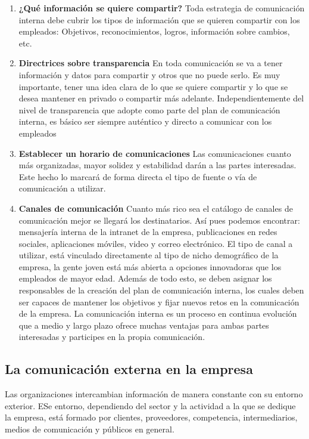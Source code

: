\begin{enumerate}
    \item \textbf{¿Qué información se quiere compartir?}
    Toda estrategia de comunicación interna debe cubrir los tipos de información
    que se quieren compartir con los empleados: Objetivos, reconocimientos, logros, información sobre cambios, etc.

    \item \textbf{Directrices sobre transparencia}
    En toda comunicación se va a tener información y datos para compartir y otros que no puede serlo.
    Es muy importante, tener una idea clara de lo que se quiere compartir y lo que se desea mantener en privado o compartir más adelante.
    Independientemente del nivel de transparencia que adopte como parte del plan de comunicación interna, es básico ser siempre auténtico y directo a comunicar con los empleados
    
    \item \textbf{Establecer un horario de comunicaciones}
    Las comunicaciones cuanto más organizadas, mayor solidez y estabilidad darán a las partes interesadas.
    Este hecho lo marcará de forma directa el tipo de fuente o vía de comunicación a utilizar.
    
    \item \textbf{Canales de comunicación}
    Cuanto más rico sea el catálogo de canales de comunicación mejor se llegará los destinatarios. Así pues podemos encontrar: mensajería interna de la intranet de la empresa, publicaciones en redes sociales, aplicaciones móviles, video y correo electrónico.
    El tipo de canal a utilizar, está vinculado directamente al tipo de nicho demográfico de la empresa, la gente joven está más abierta a opciones innovadoras que los empleados de mayor edad.
    Además de todo esto, se deben asignar los responsables de la creación del plan de comunicación interna, los cuales deben ser capaces de  mantener los objetivos y fijar nuevos retos en la comunicación de la empresa.
    La comunicación interna es un proceso  en continua evolución que a medio y largo plazo ofrece muchas ventajas para ambas partes interesadas y participes en la propia comunicación.
\end{enumerate}

\subsection{La comunicación externa en la empresa}
Las organizaciones intercambian información de manera constante con su
entorno exterior. ESe entorno, dependiendo del sector y la actividad
a la que se dedique la empresa, está formado por clientes, proveedores,
competencia, intermediarios, medios de comunicación y públicos en general.

